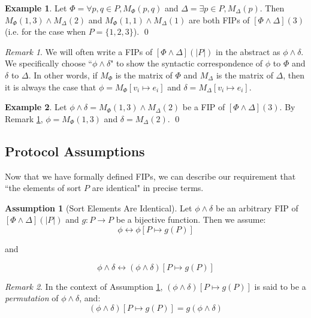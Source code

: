 \documentclass[12pt]{article}
\theoremstyle{definition}
\newtheorem{assumption}{Assumption}
\newtheorem{example}{Example}
\theoremstyle{remark}
\newtheorem{remark}{Remark}
\begin{document}
\begin{example}
  Let $\Phi = \forall p,q \in P, M_{\Phi}(p,q)$ and $\Delta = \exists p \in P, M_{\Delta}(p)$.  Then $M_{\Phi}(1,3) \land M_{\Delta}(2)$ and $M_{\Phi}(1,1) \land M_{\Delta}(1)$ are both FIPs of $[\Phi\land\Delta](3)$ (i.e. for the case when $P=\{1,2,3\}$).  
  \qed
\end{example}

\begin{remark}
  \label{rmk:fip-syntax}
  We will often write a FIPs of $[\Phi\land\Delta](|P|)$ in the abstract as $\phi\land\delta$.  We specifically choose ``$\phi\land\delta$" to show the syntactic correspondence of $\phi$ to $\Phi$ and $\delta$ to $\Delta$.  In other words, if $M_{\Phi}$ is the matrix of $\Phi$ and $M_{\Delta}$ is the matrix of $\Delta$, then it is always the case that $\phi = M_{\Phi}[v_i \mapsto e_i]$ and $\delta = M_{\Delta}[v_i \mapsto e_i]$.
\end{remark}

\begin{example}
  Let $\phi\land\delta = M_{\Phi}(1,3) \land M_{\Delta}(2)$ be a FIP of $[\Phi\land\Delta](3)$.  By Remark \ref{rmk:fip-syntax}, $\phi = M_{\Phi}(1,3)$ and $\delta = M_{\Delta}(2)$.
  \qed
\end{example}


\subsection{Protocol Assumptions}

Now that we have formally defined FIPs, we can describe our requirement that ``the elements of sort $P$ are identical" in precise terms.

\begin{assumption}[Sort Elements Are Identical]
  \label{asmp:perm}
  Let $\phi\land\delta$ be an arbitrary FIP of $[\Phi\land\Delta](|P|)$ and $g : P \to P$ be a bijective function.  Then we assume:
  $$\phi \leftrightarrow \phi[P \mapsto g(P)]$$
  \begin{center}
    and
  \end{center}
  $$\phi\land\delta \leftrightarrow (\phi\land\delta)[P \mapsto g(P)]$$
\end{assumption}

\begin{remark}
  In the context of Assumption \ref{asmp:perm}, $(\phi\land\delta)[P \mapsto g(P)]$ is said to be a \textit{permutation} of $\phi\land\delta$, and:
  $$(\phi\land\delta)[P \mapsto g(P)] = g(\phi\land\delta)$$
\end{remark}
\end{document}
